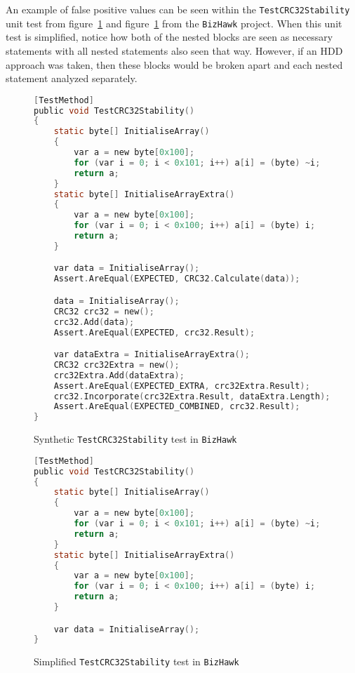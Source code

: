 An example of false positive values can be seen within the \texttt{TestCRC32Stability} unit test from figure~\ref{fig:testCRC32StabilityOriginal} and figure~\ref{fig:testCRC32StabilityOriginal} from the \texttt{BizHawk} project. When this unit test is simplified, notice how both of the nested blocks are seen as necessary statements with all nested statements also seen that way. However, if an HDD approach was taken, then these blocks would be broken apart and each nested statement analyzed separately.

\begin{figure}
\begin{lstlisting}[language=C, linewidth=\linewidth]
[TestMethod]
public void TestCRC32Stability()
{
	static byte[] InitialiseArray()
	{
		var a = new byte[0x100];
		for (var i = 0; i < 0x101; i++) a[i] = (byte) ~i;
		return a;
	}
	static byte[] InitialiseArrayExtra()
	{
		var a = new byte[0x100];
		for (var i = 0; i < 0x100; i++) a[i] = (byte) i;
		return a;
	}

	var data = InitialiseArray();
	Assert.AreEqual(EXPECTED, CRC32.Calculate(data));

	data = InitialiseArray();
	CRC32 crc32 = new();
	crc32.Add(data);
	Assert.AreEqual(EXPECTED, crc32.Result);

	var dataExtra = InitialiseArrayExtra();
	CRC32 crc32Extra = new();
	crc32Extra.Add(dataExtra);
	Assert.AreEqual(EXPECTED_EXTRA, crc32Extra.Result);
	crc32.Incorporate(crc32Extra.Result, dataExtra.Length);
	Assert.AreEqual(EXPECTED_COMBINED, crc32.Result);
}
\end{lstlisting}

\caption{Synthetic \texttt{TestCRC32Stability} test in \texttt{BizHawk}}
\label{fig:testCRC32StabilityOriginal}
\end{figure}

\begin{figure}
\begin{lstlisting}[language=C, linewidth=\linewidth]
[TestMethod]
public void TestCRC32Stability()
{
	static byte[] InitialiseArray()
	{
		var a = new byte[0x100];
		for (var i = 0; i < 0x101; i++) a[i] = (byte) ~i;
		return a;
	}
	static byte[] InitialiseArrayExtra()
	{
		var a = new byte[0x100];
		for (var i = 0; i < 0x100; i++) a[i] = (byte) i;
		return a;
	}

	var data = InitialiseArray();
}
\end{lstlisting}

\caption{Simplified \texttt{TestCRC32Stability} test in \texttt{BizHawk}}
\label{fig:testCEC32StabilitySimplified}
\end{figure}


